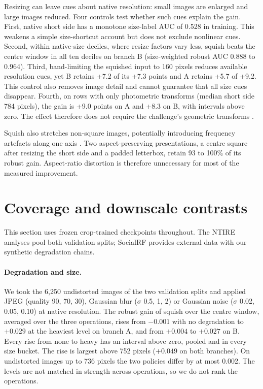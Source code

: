 \documentclass[letterpaper]{article} %
\begin{document}
Resizing can leave cues about native resolution: small images are enlarged
and large images reduced. Four controls test whether such cues explain the
gain. First, native short side has a monotone size-label AUC of 0.528 in
training. This weakens a simple size-shortcut account but does not exclude
nonlinear cues. Second, within native-size deciles, where resize factors
vary less, squish beats the centre window in all ten deciles on branch B
(size-weighted robust AUC 0.888 to 0.964). Third, band-limiting the squished
input to 160 pixels reduces available resolution cues, yet B retains +7.2
of its +7.3 points and A retains +5.7 of +9.2. This control also removes
image detail and cannot guarantee that all size cues disappear. Fourth,
on rows with only photometric transforms (median short side 784 pixels),
the gain is +9.0 points on A and +8.3 on B, with intervals above zero.
The effect therefore does not require the challenge's geometric
transforms \cite{gushchin2026ntire}.

Squish also stretches non-square images, potentially introducing frequency
artefacts along one axis \cite{grommelt2024fakeorjpeg}. Two
aspect-preserving presentations, a centre square after resizing the short
side and a padded letterbox, retain 93 to 100\% of its robust gain.
Aspect-ratio distortion is therefore unnecessary for most of the measured
improvement.

\section{Coverage and downscale contrasts}
\label{sec:decomp}

This section uses frozen crop-trained checkpoints throughout. The NTIRE
analyses pool both validation splits; SocialRF provides external data with
our synthetic degradation chains.

\paragraph{Degradation and size.} We took the 6,250 undistorted images of the
two validation splits and applied JPEG (quality 90, 70, 30), Gaussian blur
($\sigma$ 0.5, 1, 2) or Gaussian noise ($\sigma$ 0.02, 0.05, 0.10) at native
resolution. The robust gain of squish over the centre window, averaged over
the three operations, rises from $-0.001$ with no degradation to $+0.029$ at
the heaviest level on branch A, and from $+0.004$ to $+0.027$ on B. Every
rise from none to heavy has an interval above zero, pooled and in every size
bucket. The rise is largest above 752 pixels ($+0.049$ on both branches). On
undistorted images up to 736 pixels the two policies differ by at most
0.002. The levels are not matched in strength across operations, so we do
not rank the operations.
\end{document}
